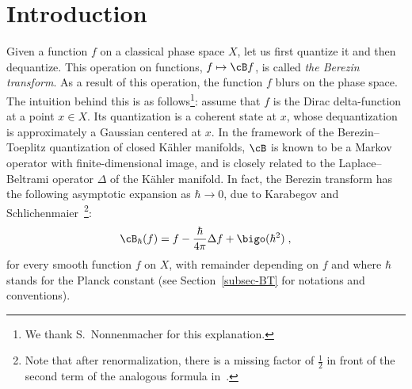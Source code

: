 \section{Introduction}

Given a function $f$ on a classical phase space $X$, let us first quantize it and then dequantize. This operation on functions, $f \mapsto \cB f$, is called \emph{the Berezin transform}. As a result of this operation, the function $f$ blurs on the phase space. The intuition behind this is as follows\footnote{We thank S.~Nonnenmacher for this explanation.}: assume that $f$ is the Dirac delta-function at a point $x \in X$. Its quantization is a coherent state at $x$, whose dequantization is approximately a Gaussian centered at $x$. In the framework of the Berezin--Toeplitz quantization of closed K\"ahler manifolds, $\cB$ is known to be a Markov operator with finite-dimensional image, and is closely related to the Laplace--Beltrami operator $\Delta$ of the K\"ahler manifold. In fact, the Berezin transform has the following asymptotic expansion as $\hbar\to 0$, due to Karabegov and Schlichenmaier~\cite{KS01}\footnote{Note that after renormalization, there is a missing factor of $\frac{1}{2}$ in front of the second term of the analogous formula in~\cite[(1.2)]{KS01}.}:
\begin{equation}\label{eq-asymp}
\cB_\hbar(f)= f-\frac{\hbar}{4\pi}\Delta f + \bigo(\hbar^2)\;,
\end{equation}
for every smooth function $f$ on $X$, with remainder depending on $f$ and where $\hbar$ stands for the Planck constant (see Section~\ref{subsec-BT} for notations and conventions).

